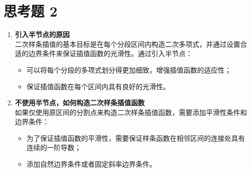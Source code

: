 \documentclass[utf8]{ctexart}
\begin{document}
\section*{思考题 2}
\begin{enumerate}
    \item \textbf{引入半节点的原因}\\
    二次样条插值的基本目标是在每个分段区间内构造二次多项式，并通过设置合适的边界条件来保证插值函数的光滑性。通过引入半节点：
    \begin{itemize}
        \item 可以将每个分段的多项式划分得更加细致，增强插值函数的适应性；
        \item 保证插值函数在每个区间内具有良好的光滑性。
    \end{itemize}
    \item \textbf{不使用半节点，如何构造二次样条插值函数}\\
    如果仅使用原区间的分割点来构造二次样条插值函数，需要添加平滑性条件和边界条件：
    \begin{itemize}
        \item 为了保证插值函数的平滑性，需要保证样条函数在相邻区间的连接处具有连续的一阶导数；
        \item 添加自然边界条件或者固定斜率边界条件。
    \end{itemize}
\end{enumerate}
\end{document}
